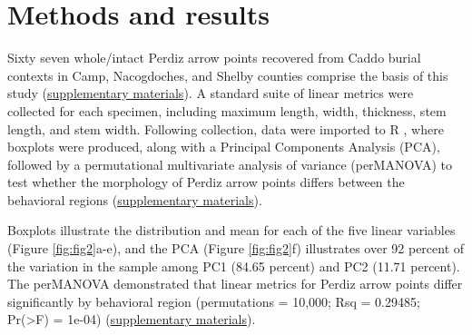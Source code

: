 \documentclass[smallextended]{svjour3}       %
\begin{document}
\hypertarget{methods-and-results}{%
\section{Methods and results}\label{methods-and-results}}

Sixty seven whole/intact Perdiz arrow points recovered from Caddo burial
contexts in Camp, Nacogdoches, and Shelby counties comprise the basis of
this study (\href{https://seldenlab.github.io/perdiz3/}{supplementary
materials}). A standard suite of linear metrics were collected for each
specimen, including maximum length, width, thickness, stem length, and
stem width. Following collection, data were imported to R \cite{RN8584},
where boxplots were produced, along with a Principal Components Analysis
(PCA), followed by a permutational multivariate analysis of variance
(perMANOVA) to test whether the morphology of Perdiz arrow points
differs between the behavioral regions
(\href{https://seldenlab.github.io/perdiz3/}{supplementary materials}).

Boxplots illustrate the distribution and mean for each of the five
linear variables (Figure \ref{fig:fig2}a-e), and the PCA (Figure
\ref{fig:fig2}f) illustrates over 92 percent of the variation in the
sample among PC1 (84.65 percent) and PC2 (11.71 percent). The perMANOVA
demonstrated that linear metrics for Perdiz arrow points differ
significantly by behavioral region (permutations = 10,000; Rsq =
0.29485; Pr(\textgreater F) = 1e-04)
(\href{https://seldenlab.github.io/perdiz3/}{supplementary materials}).
\end{document}
